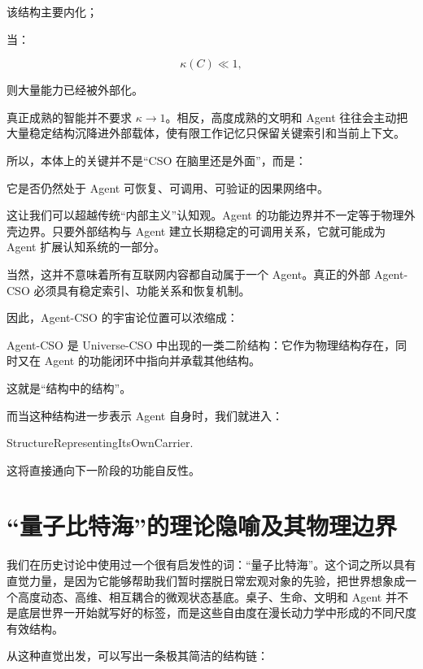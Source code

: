 该结构主要内化；

当：

\[
\kappa(C)\ll1,
\]

则大量能力已经被外部化。

真正成熟的智能并不要求 $\kappa\rightarrow1$。相反，高度成熟的文明和 Agent 往往会主动把大量稳定结构沉降进外部载体，使有限工作记忆只保留关键索引和当前上下文。

所以，本体上的关键并不是“CSO 在脑里还是外面”，而是：

\begin{statementbox}
它是否仍然处于 Agent 可恢复、可调用、可验证的因果网络中。
\end{statementbox}

这让我们可以超越传统“内部主义”认知观。Agent 的功能边界并不一定等于物理外壳边界。只要外部结构与 Agent 建立长期稳定的可调用关系，它就可能成为 Agent 扩展认知系统的一部分。

当然，这并不意味着所有互联网内容都自动属于一个 Agent。真正的外部 Agent-CSO 必须具有稳定索引、功能关系和恢复机制。

因此，Agent-CSO 的宇宙论位置可以浓缩成：

\begin{statementbox}
Agent-CSO 是 Universe-CSO 中出现的一类二阶结构：它作为物理结构存在，同时又在 Agent 的功能闭环中指向并承载其他结构。
\end{statementbox}

这就是“结构中的结构”。

而当这种结构进一步表示 Agent 自身时，我们就进入：

\begin{statementbox}
StructureRepresentingItsOwnCarrier.
\end{statementbox}

这将直接通向下一阶段的功能自反性。

\section{“量子比特海”的理论隐喻及其物理边界}

我们在历史讨论中使用过一个很有启发性的词：“量子比特海”。这个词之所以具有直觉力量，是因为它能够帮助我们暂时摆脱日常宏观对象的先验，把世界想象成一个高度动态、高维、相互耦合的微观状态基底。桌子、生命、文明和 Agent 并不是底层世界一开始就写好的标签，而是这些自由度在漫长动力学中形成的不同尺度有效结构。

从这种直觉出发，可以写出一条极其简洁的结构链：

\begin{statementbox}
\centering
{}
\end{statementbox}

